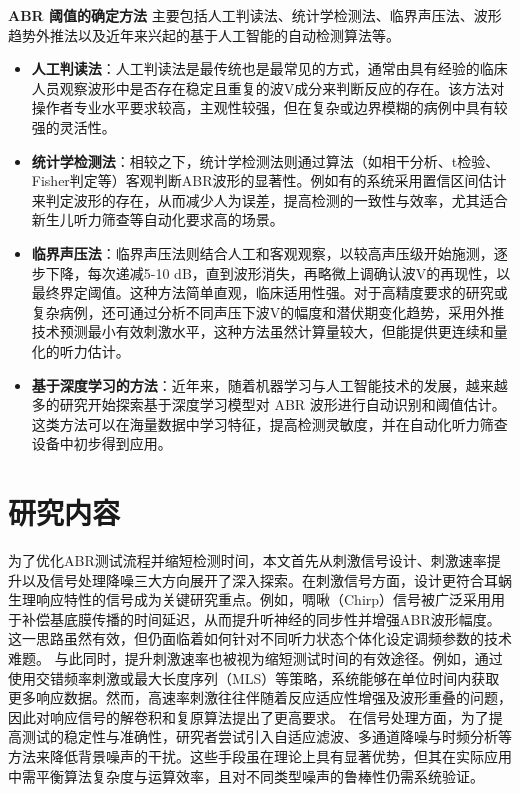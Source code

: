 \textbf{ABR 阈值的确定方法} 主要包括人工判读法、统计学检测法、临界声压法、波形趋势外推法以及近年来兴起的基于人工智能的自动检测算法等。
\begin{itemize}
  \item \textbf{人工判读法}：人工判读法是最传统也是最常见的方式，通常由具有经验的临床人员观察波形中是否存在稳定且重复的波V成分来判断反应的存在。该方法对操作者专业水平要求较高，主观性较强，但在复杂或边界模糊的病例中具有较强的灵活性。

  \item \textbf{统计学检测法}：相较之下，统计学检测法则通过算法（如相干分析、t检验、Fisher判定等）客观判断ABR波形的显著性。例如有的系统采用置信区间估计来判定波形的存在，从而减少人为误差，提高检测的一致性与效率，尤其适合新生儿听力筛查等自动化要求高的场景。

  \item \textbf{临界声压法}：临界声压法则结合人工和客观观察，以较高声压级开始施测，逐步下降，每次递减5-10 dB，直到波形消失，再略微上调确认波V的再现性，以最终界定阈值。这种方法简单直观，临床适用性强。对于高精度要求的研究或复杂病例，还可通过分析不同声压下波V的幅度和潜伏期变化趋势，采用外推技术预测最小有效刺激水平，这种方法虽然计算量较大，但能提供更连续和量化的听力估计。

  \item \textbf{基于深度学习的方法}：近年来，随着机器学习与人工智能技术的发展，越来越多的研究开始探索基于深度学习模型对 ABR 波形进行自动识别和阈值估计。这类方法可以在海量数据中学习特征，提高检测灵敏度，并在自动化听力筛查设备中初步得到应用。
\end{itemize}

\section{研究内容}
为了优化ABR测试流程并缩短检测时间，本文首先从刺激信号设计、刺激速率提升以及信号处理降噪三大方向展开了深入探索。在刺激信号方面，设计更符合耳蜗生理响应特性的信号成为关键研究重点。例如，啁啾（Chirp）信号被广泛采用用于补偿基底膜传播的时间延迟，从而提升听神经的同步性并增强ABR波形幅度。这一思路虽然有效，但仍面临着如何针对不同听力状态个体化设定调频参数的技术难题。
与此同时，提升刺激速率也被视为缩短测试时间的有效途径。例如，通过使用交错频率刺激或最大长度序列（MLS）等策略，系统能够在单位时间内获取更多响应数据。然而，高速率刺激往往伴随着反应适应性增强及波形重叠的问题，因此对响应信号的解卷积和复原算法提出了更高要求。
在信号处理方面，为了提高测试的稳定性与准确性，研究者尝试引入自适应滤波、多通道降噪与时频分析等方法来降低背景噪声的干扰。这些手段虽在理论上具有显著优势，但其在实际应用中需平衡算法复杂度与运算效率，且对不同类型噪声的鲁棒性仍需系统验证。



